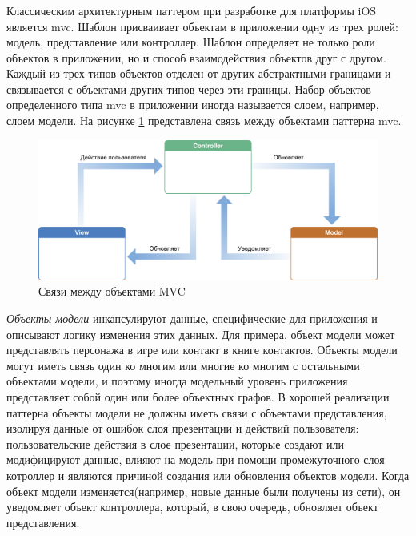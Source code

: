 \subsubsection {}
\label{sec:analysis:research:mobArch:mvc}

Классическим архитектурным паттером при разработке для платформы iOS является \gls{mvc}. Шаблон присваивает объектам в приложении одну из трех ролей: модель, представление или контроллер. Шаблон определяет не только роли объектов в приложении, но и способ взаимодействия объектов друг с другом. Каждый из трех типов объектов отделен от других абстрактными границами и связывается с объектами других типов через эти границы. Набор объектов определенного типа \gls{mvc} в приложении иногда называется слоем, например, слоем модели. \cite{apple:mvc} На рисунке \ref{sec:analysis:research:mobArch:apple-mvc:image:mvc} представлена связь между объектами паттерна \gls{mvc}.

\begin{figure}[h]
  \centering
    \includegraphics[width=1\textwidth]{inc/img/mvc.png}
  \caption{Связи между объектами MVC}
  \label{sec:analysis:research:mobArch:apple-mvc:image:mvc}
\end{figure}

\emph{Объекты модели} инкапсулируют данные, специфические для приложения и описывают логику изменения этих данных. Для примера, объект модели может представлять персонажа в игре или контакт в книге контактов. Объекты модели могут иметь связь один ко многим или многие ко многим с остальными объектами модели, и поэтому иногда модельный уровень приложения представляет собой один или более объектных графов. В хорошей реализации паттерна объекты модели не должны иметь связи с объектами представления, изолируя данные от ошибок слоя презентации и действий пользователя: пользовательские действия в слое презентации, которые создают или модифицируют данные, влияют на модель при помощи промежуточного слоя котроллер и являются причиной создания или обновления объектов модели. Когда объект модели изменяется(например, новые данные были получены из сети), он уведомляет объект контроллера, который, в свою очередь, обновляет объект представления.

